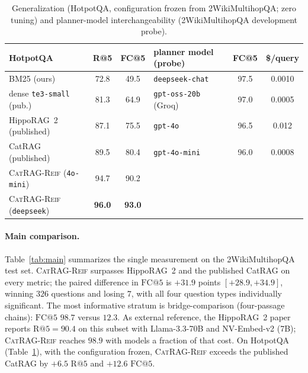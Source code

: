 \documentclass[11pt,a4paper]{article}
\newcommand{\sys}{\textsc{CatRAG-Reif}}
\newcommand{\hippo}{HippoRAG~2}
\begin{document}
\begin{table}[t]
\centering\small
\caption{Generalization (HotpotQA, configuration frozen from
2WikiMultihopQA; zero tuning) and planner-model interchangeability
(2WikiMultihopQA development probe).}
\label{tab:hotpot}
\begin{tabular}{lcc@{\qquad}lcc}
\toprule
HotpotQA & R@5 & FC@5 & planner model (probe) & FC@5 & \$/query\\
\midrule
BM25 (ours) & 72.8 & 49.5 & \texttt{deepseek-chat} & 97.5 & 0.0010\\
dense \texttt{te3-small} (pub.) & 81.3 & 64.9 & \texttt{gpt-oss-20b} (Groq) & 97.0 & 0.0005\\
\hippo{} (published) & 87.1 & 75.5 & \texttt{gpt-4o} & 96.5 & 0.012\\
CatRAG (published) & 89.5 & 80.4 & \texttt{gpt-4o-mini} & 96.0 & 0.0008\\
\sys{} (\texttt{4o-mini}) & 94.7 & 90.2 & & & \\
\sys{} (\texttt{deepseek}) & \textbf{96.0} & \textbf{93.0} & & & \\
\bottomrule
\end{tabular}
\end{table}

\paragraph{Main comparison.} Table~\ref{tab:main} summarizes the single
measurement on the 2WikiMultihopQA test set. \sys{} surpasses \hippo{} and
the published CatRAG on every metric; the paired difference in
$\mathrm{FC@}5$ is $+31.9$ points $[+28.9,+34.9]$, winning $326$ questions
and losing $7$, with all four question types individually significant. The
most informative stratum is bridge-comparison (four-passage chains):
$\mathrm{FC@}5$ $98.7$ versus $12.3$. As external reference, the \hippo{}
paper reports $\mathrm{R@}5=90.4$ on this subset with Llama-3.3-70B and
NV-Embed-v2 (7B); \sys{} reaches $98.9$ with models a fraction of that cost.
On HotpotQA (Table~\ref{tab:hotpot}), with the configuration frozen, \sys{}
exceeds the published CatRAG by $+6.5$ $\mathrm{R@}5$ and $+12.6$
$\mathrm{FC@}5$.
\end{document}
